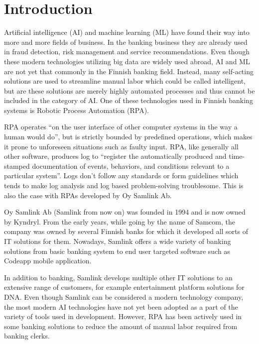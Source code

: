 

\section{Introduction}\label{sec:introduction}

\thispagestyle{empty}

Artificial intelligence (AI) and machine learning (ML)
have found their way into
more and more fields of business.
In the banking business they are already used in
fraud detection, risk management and service recommendations.\cite{donepudi2017machine}
Even though these
modern technologies utilizing big data
are widely used abroad,
AI and ML are not yet that commonly in the Finnish banking field.
Instead,
many self-acting solutions are used
to streamline manual labor
which could be called intelligent,
but are these solutions are merely highly automated processes
and thus cannot be included in the category of AI.\@
One of these technologies used in Finnish banking systems
is Robotic Process Automation (RPA).

RPA operates \enquote{on the user interface of other computer systems
in the way a human would do},\cite{van2018robotic}
but is strictly bounded by predefined operations,
which makes it prone to unforeseen situations
such as faulty input.
RPA, like generally all other software,
produces log to \enquote{register
the automatically produced and time-stamped documentation
of events, behaviors, and conditions
relevant to a particular system}\cite{delarosa2018log}.
Logs don't follow any standards or form guidelines
which tends to make
log analysis and log based problem-solving troublesome.
This is also the case with RPAs developed by Oy Samlink Ab.

Oy Samlink Ab (Samlink from now on)
was founded in 1994
and is now owned by Kyndryl.
From the early years,
while going by the name of Samcom,
the company was owned by several Finnish banks
for which it developed all sorts of IT solutions for them.
Nowadays,
Samlink offers a wide variety of banking solutions
from basic banking system to end user targeted software
such as Codeapp mobile application.

In addition to banking,
Samlink develops multiple other IT solutions
to an extensive range of customers,
for example
entertainment platform solutions for DNA\@.
Even though Samlink can be considered
a modern technology company,
the most modern AI technologies have not yet been adopted
as a part of the variety of tools used in development.
However,
RPA has been actively used
in some banking solutions
to reduce the amount of manual labor required
from banking clerks.

